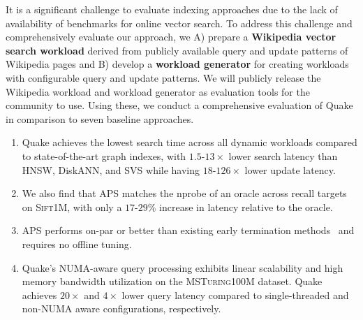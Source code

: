 
It is a significant challenge to evaluate indexing approaches due to the lack of availability of benchmarks for online vector search. To address this challenge and comprehensively evaluate our approach, we A) prepare a \textbf{Wikipedia vector search workload} derived from publicly available query and update patterns of Wikipedia pages and B) develop a \textbf{workload generator} for creating workloads with configurable query and update patterns. We will publicly release the Wikipedia workload and workload generator as evaluation tools for the community to use. Using these, we conduct a comprehensive evaluation of Quake in comparison to seven baseline approaches.

\begin{enumerate}[leftmargin=*, itemsep=-1pt, topsep=0pt]
    \item Quake achieves the lowest search time across all dynamic workloads compared to state-of-the-art graph indexes, with $1.5$-$13\times$ lower search latency than HNSW, DiskANN, and SVS while having $18$-$126\times$ lower update latency.
    \item We also find that APS matches the nprobe of an oracle across recall targets on \textsc{Sift1M}, with only a $17$-$29\%$ increase in latency relative to the oracle. 
    \item APS performs on-par or better than existing early termination methods~\cite{zhang2023fast, chen_spann_nodate, li2020improving} and requires no offline tuning. %
    \item Quake's NUMA-aware query processing exhibits linear scalability and high memory bandwidth utilization on the \textsc{MSTuring100M} dataset. Quake achieves $20\times$ and $4\times$ lower query latency compared to single-threaded and non-NUMA aware configurations, respectively.%
\end{enumerate}
